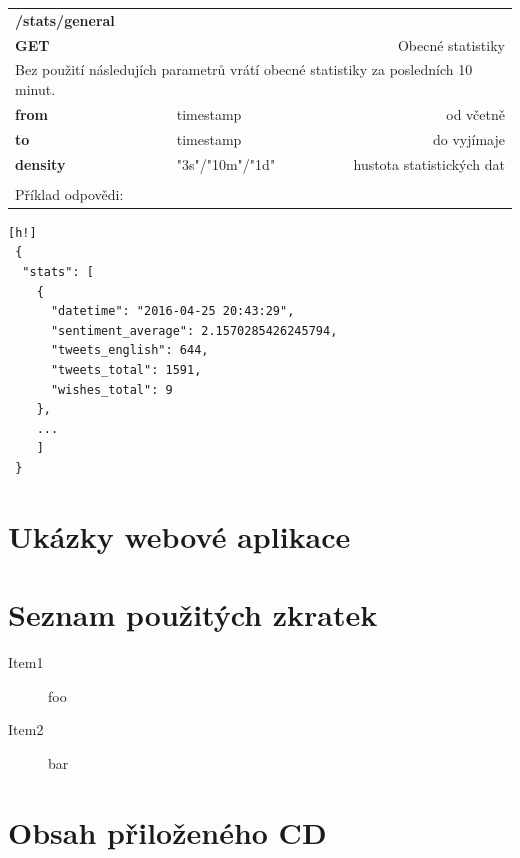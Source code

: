 \documentclass[thesis=B,czech]{FITthesis}[2012/06/26]
\begin{document}
\begin{table}[h]
\begin{tabular}{llllr}
\rowcolor[HTML]{EFEFEF}
\large \textbf{/stats/general}        &         &                 &        & \multicolumn{1}{l}{}                \\
\rowcolor[HTML]{EFEFEF}
\textbf{GET}          &         &                 &        & Obecné statistiky                        \\
\multicolumn{5}{l}{\parbox[t]{12.8cm}{Bez použití následujích parametrů vrátí obecné statistiky za posledních 10 minut.  }  } \\
\textbf{from}         &         & timestamp       &        & od včetně                           \\
\textbf{to}           &         & timestamp       &        & do vyjímaje                         \\
\textbf{density}        &         & "3s"/"10m"/"1d"         &        & hustota statistických dat   \\
 & & & & \\
 Příklad odpovědi:   \\
\end{tabular}
\end{table}

\begin{lstlisting}[nolol=true][h!]
 {
  "stats": [
    {
      "datetime": "2016-04-25 20:43:29",
      "sentiment_average": 2.1570285426245794,
      "tweets_english": 644,
      "tweets_total": 1591,
      "wishes_total": 9
    },
    ...
    ]
 }
\end{lstlisting}

\chapter{Ukázky webové aplikace}
\label{appendix-web}

\chapter{Seznam použitých zkratek}
\begin{description}
	\item[Item1] foo
	\item[Item2] bar
\end{description}

\chapter{Obsah přiloženého CD}


\begin{figure}
\end{figure}
\end{document}
